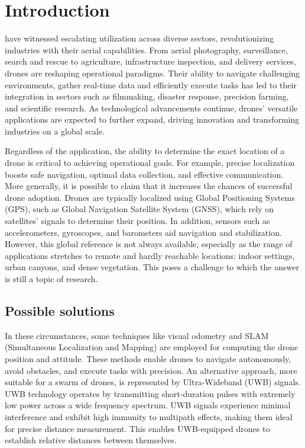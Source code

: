 \section{Introduction}\label{sec:introduction_section}

 have witnessed escalating utilization across diverse sectors, revolutionizing industries with their aerial capabilities. From aerial photography, surveillance, search and rescue to agriculture, infrastructure inspection, and delivery services, drones are reshaping operational paradigms. Their ability to navigate challenging environments, gather real-time data and efficiently execute tasks has led to their integration in sectors such as filmmaking, disaster response, precision farming, and scientific research. As technological advancements continue, drones' versatile applications are expected to further expand, driving innovation and transforming industries on a global scale.
\par

Regardless of the application, the ability to determine the exact location of a drone is critical to achieving operational goals.
For example, precise localization boosts safe navigation, optimal data collection, and effective communication. More generally, it is possible to claim that it increases the chances of successful drone adoption.
Drones are typically localized using Global Positioning Systems (GPS), such as Global Navigation Satellite System (GNSS), which rely on satellites' signals to determine their position. In addition, sensors such as accelerometers, gyroscopes, and barometers aid navigation and stabilization. 
However, this global reference is not always available, especially as the range of applications stretches to remote and hardly reachable locations: indoor settings, urban canyons, and dense vegetation.
This poses a challenge to which the answer is still a topic of research.
\par

\subsection{Possible solutions}
In these circumstances, some techniques like visual odometry and SLAM (Simultaneous Localization and Mapping) are employed for computing the drone position and attitude. These methods enable drones to navigate autonomously, avoid obstacles, and execute tasks with precision.
An alternative approach, more suitable for a swarm of drones, is represented by Ultra-Wideband (UWB) signals. UWB technology operates by transmitting short-duration pulses with extremely low power across a wide frequency spectrum. UWB signals experience minimal interference and exhibit high immunity to multipath effects, making them ideal for precise distance measurement. This enables UWB-equipped drones to establish relative distances between themselves. 
\par

